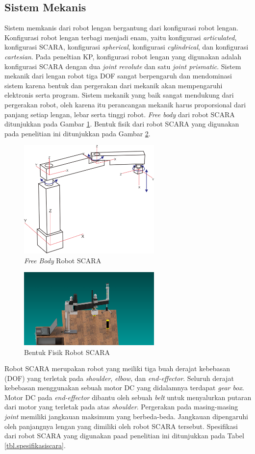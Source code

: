 \subsection{ Sistem Mekanis }
Sistem memkanis dari robot lengan bergantung dari konfigurasi robot lengan. Konfigurasi robot lengan terbagi menjadi enam, yaitu konfigurasi \textit{articulated}, konfigurasi SCARA, konfigurasi \textit{spherical}, konfigurasi \textit{cylindrical}, dan konfigurasi \textit{cartesian}. Pada peneltian KP, konfigurasi robot lengan yang digunakan adalah konfigurasi SCARA dengan dua \textit{joint} \textit{revolute} dan satu \textit{joint prismatic}. Sistem mekanik dari lengan robot tiga DOF sangat berpengaruh dan mendominasi sistem karena bentuk dan pergerakan dari mekanik akan mempengaruhi elektronis serta program. Sistem mekanik yang baik sangat mendukung dari pergerakan robot, oleh karena itu perancangan mekanik harus proporsional dari panjang setiap lengan, lebar serta tinggi robot. \textit{Free body} dari robot SCARA ditunjukkan pada Gambar \ref{pic.freebodyscara}. Bentuk fisik dari robot SCARA yang digunakan pada penelitian ini ditunjukkan pada Gambar \ref{pic.fisikscara}. 
\begin{figure}[H]
	\centering
	\includegraphics[width=7cm]{gambar/scaraa.png}
	\caption{\textit{Free Body} Robot SCARA}
	\label{pic.freebodyscara}
\end{figure}
\begin{figure}[H]
	\centering
	\includegraphics[width=7cm]{gambar/3dscara.png}
	\caption{Bentuk Fisik Robot SCARA}
	\label{pic.fisikscara}
\end{figure}
Robot SCARA merupakan robot yang meiliki tiga buah derajat kebebasan (DOF) yang terletak pada \textit{shoulder}, \textit{elbow}, dan \textit{end-effector}. Seluruh derajat kebebasan menggunakan sebuah motor DC yang didalamnya terdapat\textit{ gear box}. Motor DC pada \textit{end-effector} dibantu oleh sebuah \textit{belt} untuk menyalurkan putaran dari motor yang terletak pada atas \textit{shoulder}. Pergerakan pada masing-masing \textit{joint} memiliki jangkauan maksimum yang berbeda-beda. Jangkauan dipengaruhi oleh panjangnya lengan yang dimiliki oleh robot SCARA tersebut\cite{bulet}. Spesifikasi dari robot SCARA yang digunakan paad penelitian ini ditunjukkan pada Tabel \ref{tbl.spesifikasiscara}. 

